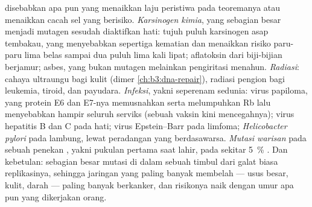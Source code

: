 \begin{proposition}[Penyebabnya]\label{prop:b3:cancer-biology:causes}
 disebabkan apa pun yang menaikkan laju peristiwa pada
teoremanya atau menaikkan cacah sel yang berisiko. \emph{Karsinogen kimia},
yang sebagian besar menjadi mutagen sesudah diaktifkan hati: tujuh puluh
karsinogen asap tembakau, yang menyebabkan sepertiga kematian  dan
menaikkan risiko  paru-paru lima belas sampai dua puluh lima kali lipat;
aflatoksin dari biji-bijian berjamur; asbes, yang bukan mutagen melainkan
pengiritasi menahun. \emph{Radiasi}: cahaya ultraungu bagi kulit (dimer
\cref{ch:b3:dna-repair}), radiasi pengion bagi leukemia, tiroid,
dan payudara. \emph{Infeksi}, yakni seperenam  sedunia: virus
papiloma, yang protein E6 dan E7-nya memusnahkan  serta melumpuhkan
Rb lalu menyebabkan hampir seluruh  serviks (sebuah vaksin kini
mencegahnya); virus hepatitis B dan C pada  hati; virus Epstein--Barr
pada limfoma; \emph{Helicobacter pylori} pada  lambung, lewat
peradangan yang berdasawarsa. \emph{Mutasi warisan} pada sebuah penekan
, yakni pukulan pertama saat lahir, pada sekitar \qty{5}{\%} . Dan
kebetulan: sebagian besar mutasi di dalam sebuah  timbul dari galat biasa
replikasinya, sehingga jaringan yang paling banyak membelah --- usus besar,
kulit, darah --- paling banyak berkanker, dan risikonya naik dengan umur apa
pun yang dikerjakan orang.
\end{proposition}

